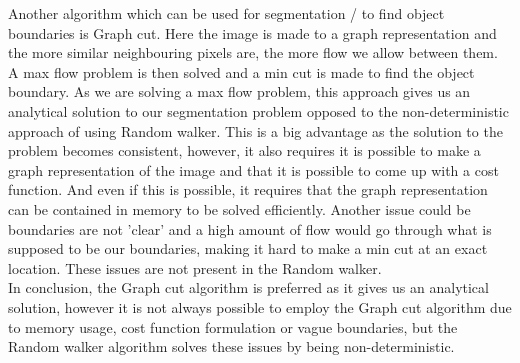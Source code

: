 Another algorithm which can be used for segmentation / to find object boundaries is Graph cut. Here the image is made to a graph representation and the more similar neighbouring pixels are, the more flow we allow between them. A max flow problem is then solved and a min cut is made to find the object boundary. As we are solving a max flow problem, this approach gives us an analytical solution to our segmentation problem opposed to the non-deterministic approach of using Random walker. This is a big advantage as the solution to the problem becomes consistent, however, it also requires it is possible to make a graph representation of the image and that it is possible to come up with a cost function. And even if this is possible, it requires that the graph representation can be contained in memory to be solved efficiently. Another issue could be boundaries are not 'clear' and a high amount of flow would go through what is supposed to be our boundaries, making it hard to make a min cut at an exact location. These issues are not present in the Random walker.\\
In conclusion, the Graph cut algorithm is preferred as it gives us an analytical solution, however it is not always possible to employ the Graph cut algorithm due to memory usage, cost function formulation or vague boundaries, but the Random walker algorithm solves these issues by being non-deterministic.